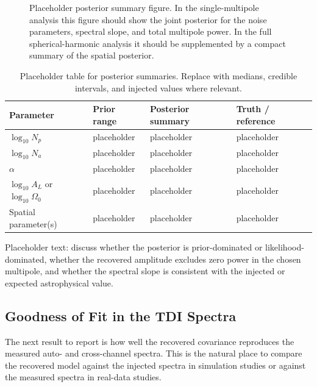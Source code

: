 \documentclass[11pt]{article}
\begin{document}
\begin{figure}[H]
\centering
{}
\caption{Placeholder posterior summary figure. In the single-multipole analysis this figure should show the joint posterior for the noise parameters, spectral slope, and total multipole power. In the full spherical-harmonic analysis it should be supplemented by a compact summary of the spatial posterior.}
\label{fig:corner}
\end{figure}

\begin{table}[H]
\centering
\caption{Placeholder table for posterior summaries. Replace with medians, credible intervals, and injected values where relevant.}
\label{tab:posteriors}
\begin{tabular}{llll}
\toprule
Parameter & Prior range & Posterior summary & Truth / reference \\
\midrule
$\log_{10}N_p$ & placeholder & placeholder & placeholder \\
$\log_{10}N_a$ & placeholder & placeholder & placeholder \\
$\alpha$ & placeholder & placeholder & placeholder \\
$\log_{10}A_L$ or $\log_{10}\Omega_0$ & placeholder & placeholder & placeholder \\
Spatial parameter(s) & placeholder & placeholder & placeholder \\
\bottomrule
\end{tabular}
\end{table}

Placeholder text: discuss whether the posterior is prior-dominated or likelihood-dominated, whether the recovered amplitude excludes zero power in the chosen multipole, and whether the spectral slope is consistent with the injected or expected astrophysical value.

\subsection{Goodness of Fit in the TDI Spectra}
The next result to report is how well the recovered covariance reproduces the measured auto- and cross-channel spectra. This is the natural place to compare the recovered model against the injected spectra in simulation studies or against the measured spectra in real-data studies.
\end{document}
